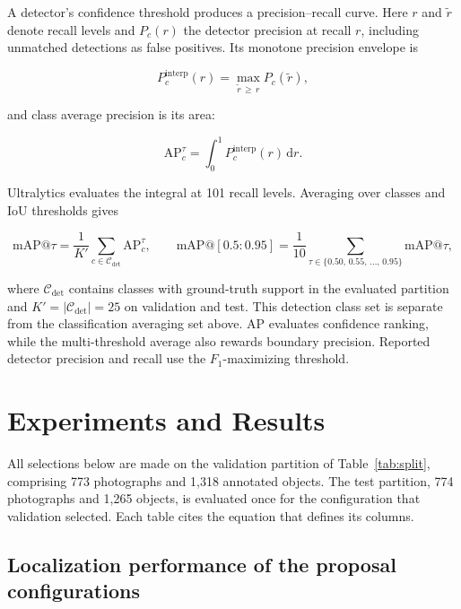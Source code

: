 \documentclass[a4paper,8pt]{article}
\begin{document}
A detector's confidence threshold produces a precision--recall curve. Here $r$ and
$\tilde{r}$ denote recall levels and $P_c(r)$ the detector precision at recall $r$, including
unmatched detections as false positives. Its monotone precision envelope is

\begin{equation}
P^{\mathrm{interp}}_c(r) = \max_{\tilde{r} \,\ge\, r} P_c(\tilde{r}),
\label{eq:interp}
\end{equation}

and class average precision is its area:

\begin{equation}
\mathrm{AP}^{\tau}_c = \int_{0}^{1} P^{\mathrm{interp}}_c(r)\, \mathrm{d}r .
\label{eq:ap}
\end{equation}

Ultralytics evaluates the integral at 101 recall levels. Averaging over classes and IoU
thresholds gives

\begin{equation}
\mathrm{mAP}@\tau = \frac{1}{K'}\sum_{c \in \mathcal{C}_{\mathrm{det}}} \mathrm{AP}^{\tau}_c,
\qquad
\mathrm{mAP}@[0.5{:}0.95] = \frac{1}{10} \sum_{\tau \in \{0.50,\,0.55,\,\dots,\,0.95\}} \mathrm{mAP}@\tau ,
\label{eq:map}
\end{equation}

where $\mathcal{C}_{\mathrm{det}}$ contains classes with ground-truth support in the evaluated
partition and $K'=|\mathcal{C}_{\mathrm{det}}|=25$ on validation and test. This detection class
set is separate from the classification averaging set above. AP evaluates confidence ranking, while the multi-threshold average also
rewards boundary precision. Reported detector precision and recall use the $F_1$-maximizing
threshold.

\section{Experiments and Results}
\label{sec:results}

All selections below are made on the validation partition of Table~\ref{tab:split}, comprising
773 photographs and 1{,}318 annotated objects. The test partition, 774 photographs and 1{,}265
objects, is evaluated once for the configuration that validation selected. Each table cites the
equation that defines its columns.

\subsection{Localization performance of the proposal configurations}
\label{sec:proposal-results}
\end{document}
